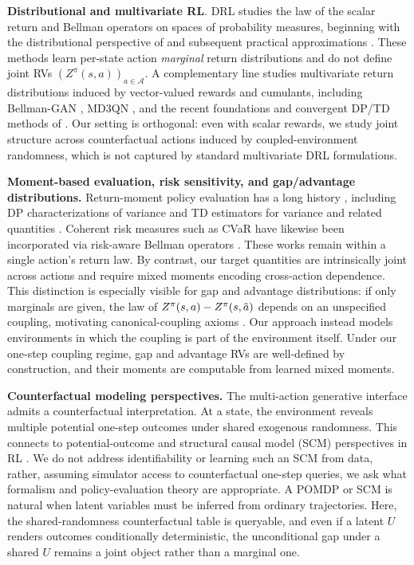 \documentclass[accepted]{uai2026}
\theoremstyle{plain}
\theoremstyle{definition}
\theoremstyle{remark}
\newcommand{\A}{\mathcal{A}}
\newcommand{\1}{\mathbbm{1}}
\begin{document}
\textbf{Distributional and multivariate RL}. DRL studies the law of the scalar return and Bellman operators on spaces of probability measures, beginning with the distributional perspective of \citet{c51} and subsequent practical approximations \citep{c51, qr-dqn, iqn, FQF, nguyen2021distributional}. These methods learn per-state action \textit{marginal} return distributions and do not define joint RVs $(Z^\pi(s, a))_{a \in \A}$. A complementary line studies multivariate return distributions induced by vector-valued rewards and cumulants, including Bellman-GAN \citep{bellman-gan}, MD3QN \citep{zhang2021distributional}, and the recent foundations and convergent DP/TD methods of \citet{wiltzer2024foundations}. Our setting is orthogonal: even with scalar rewards, we study joint structure across counterfactual actions induced by coupled-environment randomness, which is not captured by standard multivariate DRL formulations.

\textbf{Moment-based evaluation, risk sensitivity, and gap/advantage distributions.} Return-moment policy evaluation has a long history \citep{sobel}, including DP characterizations of variance and TD estimators for variance and related quantities \citep{mv-mdp, tamar2, estimating-variance}. Coherent risk measures such as CVaR have likewise been incorporated via risk-aware Bellman operators \citep{cvar-mdp}. These works remain within a single action's return law. By contrast, our target quantities are intrinsically joint across actions and require mixed moments encoding cross-action dependence. This distinction is especially visible for gap and advantage distributions: if only marginals are given, the law of $Z^\pi(s, a) - Z^\pi(s, \Tilde{a})$ depends on an unspecified coupling, motivating canonical-coupling axioms \citep{wiltzer2024action}. Our approach instead models environments in which the coupling is part of the environment itself. Under our one-step coupling regime, gap and advantage RVs are well-defined by construction, and their moments are computable from learned mixed moments.

\textbf{Counterfactual modeling perspectives.} The multi-action generative interface admits a counterfactual interpretation. At a state, the environment reveals multiple potential one-step outcomes under shared exogenous randomness. This connects to potential-outcome and structural causal model (SCM) perspectives in RL \citep{lu2020sample, amitai2024explaining}. We do not address identifiability or learning such an SCM from data, rather, assuming simulator access to counterfactual one-step queries, we ask what formalism and policy-evaluation theory are appropriate. A POMDP or SCM is natural when latent variables must be inferred from ordinary trajectories. Here, the shared-randomness counterfactual table is queryable, and even if a latent $U$ renders outcomes conditionally deterministic, the unconditional gap under a shared $U$ remains a joint object rather than a marginal one.
\end{document}
